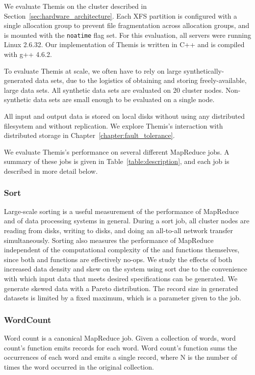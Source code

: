 We evaluate Themis on the cluster described in
Section~\ref{sec:hardware_architecture}. Each XFS partition is configured with
a single allocation group to prevent file fragmentation across allocation
groups, and is mounted with the \texttt{noatime} flag set. For this evaluation,
all servers were running Linux 2.6.32. Our implementation of Themis is written
in C++ and is compiled with g++ 4.6.2.

To evaluate Themis at scale, we often have to rely on large
synthetically-generated data sets, due to the logistics of obtaining and
storing freely-available, large data sets.  All synthetic data sets are
evaluated on 20 cluster nodes. Non-synthetic data sets are small enough to
be evaluated on a single node.

All input and output data is stored on local disks without using any
distributed filesystem and without replication. We explore Themis's interaction
with distributed storage in Chapter~\ref{chapter:fault_tolerance}.

We evaluate Themis's performance on several different MapReduce jobs. A
summary of these jobs is given in Table~\ref{table:description}, and each job
is described in more detail below.

\subsubsection{Sort}

Large-scale sorting is a useful measurement of the
performance of MapReduce and of data processing systems in general.  During a
sort job, all cluster nodes are reading from disks, writing to disks, and doing
an all-to-all network transfer simultaneously.  Sorting also measures the
performance of MapReduce independent of the computational complexity of the
\map and \reduce functions themselves, since both \map and \reduce functions
are effectively no-ops. We study the effects of both increased data density and
skew on the system using sort due to the convenience with which input data that
meets desired specifications can be generated.  We generate skewed data with a
Pareto distribution.  The record size in generated datasets is limited by a
fixed maximum, which is a parameter given to the job.

\subsubsection{WordCount}

Word count is a canonical MapReduce job. Given a
collection of words, word count's \map function emits  records
for each word.  Word count's \reduce function sums the occurrences of each word
and emits a single  record, where N is the number of times
the word occurred in the original collection.


